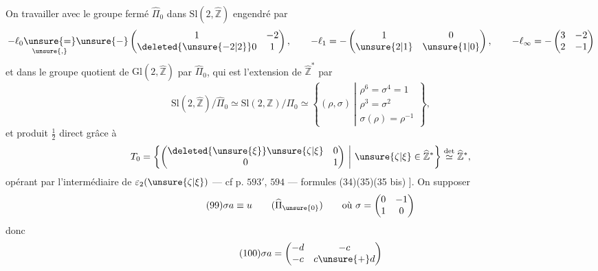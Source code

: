 On  travailler avec le groupe fermé
$\widehat\Pi_0$ dans $\mathrm{Sl}(2,\widehat{\mathbb Z})$ engendré par
\[
\begin{gathered}
-\ell_0\underset{\unsure{,}}{\unsure{=}}\unsure{-}\begin{pmatrix}
1&-2\\\deleted{\unsure{-2|2}}0&1
\end{pmatrix},\qquad
-\ell_1=-\begin{pmatrix}1&0\\\unsure{2|1}&\unsure{1|0}\end{pmatrix},\qquad
-\ell_\infty=-\begin{pmatrix}3&-2\\2&-1\end{pmatrix}
\end{gathered}
\]
et dans le groupe quotient de
$\mathrm{Gl}(2,\widehat{\mathbb Z})$ par $\widehat\Pi_0$, qui est
 l'extension de
$\widehat{\mathbb Z}^{*}$ par
\[
\mathrm{Sl}(2,\widehat{\mathbb Z})/\widehat\Pi_0
\simeq\mathrm{Sl}(2,\mathbb Z)/\Pi_0
\simeq\left\{(\rho,\sigma)\ \left|\begin{array}{l}
\rho^6=\sigma^4=1\\
\rho^3=\sigma^2\\
\sigma(\rho)=\rho^{-1}
\end{array}\right.\right\},
\]
 et  produit $\frac12$ direct grâce à
\[
T_0=\left\{\begin{pmatrix}
\deleted{\unsure{\xi}}\unsure{\zeta|\xi}&0\\0&1
\end{pmatrix}\ \middle|\ \unsure{\zeta|\xi}\in\widehat{\mathbb Z}^{*}\right\}
\overset{\det}{\simeq}\widehat{\mathbb Z}^{*},
\]
opérant par l'intermédiaire de $\varepsilon_2(\unsure{\zeta|\xi})$
--- cf p. $593'$, $594$ --- formules (34)(35)(35 bis) ].
On  supposer
\[
\tag{99}
\sigma a\equiv u\qquad(\widehat\Pi_{\unsure{0}})
\qquad\text{où }\sigma=\begin{pmatrix}0&-1\\1&0\end{pmatrix}
\]
donc
\[
\tag{100}
\sigma a=\begin{pmatrix}-d&-c\\-c&c\unsure{+}d\end{pmatrix}
\]

